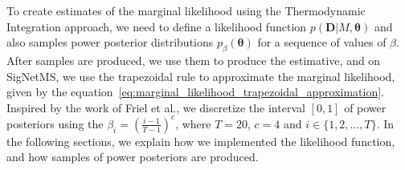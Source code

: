 
To create estimates of the marginal likelihood using the Thermodynamic
Integration approach, we need to define a likelihood function $p({\bm
D}| M, {\bm \theta})$ and also samples power posterior distributions
$p_\beta({\bm \theta})$ for a sequence of values of $\beta$. After
samples are produced, we use them to produce the estimative, and on
SigNetMS, we use the trapezoidal rule to approximate the marginal 
likelihood, given by the 
equation~\ref{eq:marginal_likelihood_trapezoidal_approximation}. 
Inspired by the work of Friel et al., we discretize the interval 
$[0, 1]$ of power posteriors using the $\beta_i = \left(\frac{i - 1}{T -
1}\right)^c$, where $T = 20$, $c = 4$ and $i \in \{1, 2, \ldots, T\}$.
In the following sections, we explain how we implemented the likelihood
function, and how samples of power posteriors are produced.

